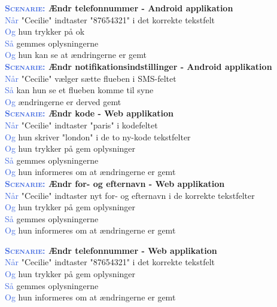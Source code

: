 \textbf{\textsc{\textcolor{RoyalBlue}{Scenarie:}} Ændr telefonnummer - Android applikation}\\
\textcolor{RoyalBlue}{Når} "Cecilie" indtaster "87654321" i det korrekte tekstfelt\\
\textcolor{RoyalBlue}{Og} hun trykker på ok\\
\textcolor{RoyalBlue}{Så} gemmes oplysningerne\\
\textcolor{RoyalBlue}{Og} hun kan se at ændringerne er gemt\\

\textbf{\textsc{\textcolor{RoyalBlue}{Scenarie:}} Ændr notifikationsindstillinger - Android applikation}\\
\textcolor{RoyalBlue}{Når} "Cecilie" vælger sætte flueben i SMS-feltet\\
\textcolor{RoyalBlue}{Så} kan hun se et flueben komme til syne\\
\textcolor{RoyalBlue}{Og} ændringerne er derved gemt\\

\textbf{\textsc{\textcolor{RoyalBlue}{Scenarie:}} Ændr kode - Web applikation}\\
\textcolor{RoyalBlue}{Når} "Cecilie" indtaster "paris" i kodefeltet\\
\textcolor{RoyalBlue}{Og} hun skriver "london" i de to ny-kode tekstfelter\\
\textcolor{RoyalBlue}{Og} hun trykker på gem oplysninger\\
\textcolor{RoyalBlue}{Så} gemmes oplysningerne\\
\textcolor{RoyalBlue}{Og} hun informeres om at ændringerne er gemt\\

\textbf{\textsc{\textcolor{RoyalBlue}{Scenarie:}} Ændr for- og efternavn - Web applikation}\\
\textcolor{RoyalBlue}{Når} "Cecilie" indtaster nyt for- og efternavn i de korrekte tekstfelter\\
\textcolor{RoyalBlue}{Og} hun trykker på gem oplysninger\\
\textcolor{RoyalBlue}{Så} gemmes oplysningerne\\
\textcolor{RoyalBlue}{Og} hun informeres om at ændringerne er gemt


\textbf{\textsc{\textcolor{RoyalBlue}{Scenarie:}} Ændr telefonnummer - Web applikation}\\
\textcolor{RoyalBlue}{Når} "Cecilie" indtaster "87654321" i det korrekte tekstfelt\\
\textcolor{RoyalBlue}{Og} hun trykker på gem oplysninger\\
\textcolor{RoyalBlue}{Så} gemmes oplysningerne\\
\textcolor{RoyalBlue}{Og} hun informeres om at ændringerne er gemt\\

